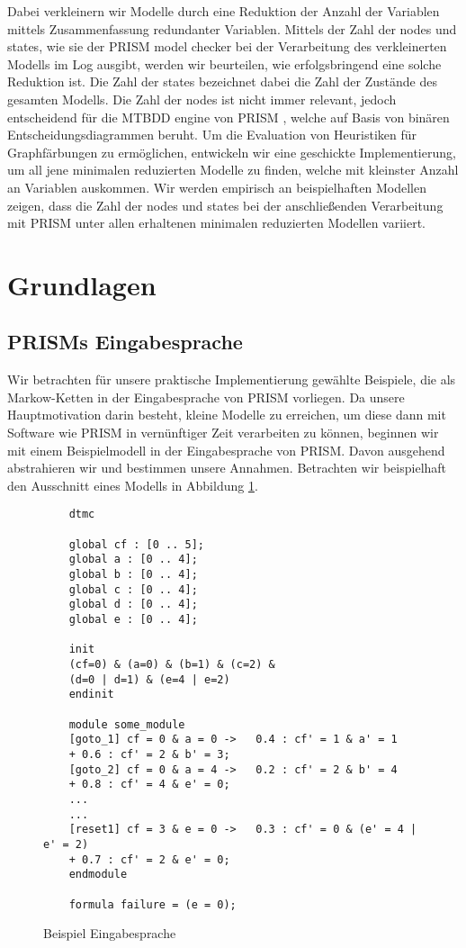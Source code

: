 \documentclass[a4paper]{article}
\newcommand{\mcpl}{Markow-Ketten}
\theoremstyle{nonumberplain}
\begin{document}
Dabei verkleinern wir Modelle durch eine Reduktion der Anzahl der Variablen mittels Zusammenfassung redundanter Variablen. Mittels der Zahl der nodes und states, wie sie der PRISM model checker bei der Verarbeitung des verkleinerten Modells im Log ausgibt, werden wir beurteilen, wie erfolgsbringend eine solche Reduktion ist. Die Zahl der states bezeichnet dabei die Zahl der Zustände des gesamten Modells. Die Zahl der nodes ist nicht immer relevant, jedoch entscheidend für die MTBDD engine von PRISM \cite{Par02}, welche auf Basis von binären Entscheidungsdiagrammen beruht.
Um die Evaluation von Heuristiken für Graphfärbungen zu ermöglichen, entwickeln wir eine geschickte Implementierung, um all jene minimalen reduzierten Modelle zu finden, welche mit kleinster Anzahl an Variablen auskommen.
Wir werden empirisch an beispielhaften Modellen zeigen, dass die Zahl der nodes und states bei der anschließenden Verarbeitung mit PRISM unter allen erhaltenen minimalen reduzierten Modellen variiert.


\section{Grundlagen}

\subsection{PRISMs Eingabesprache}

Wir betrachten für unsere praktische Implementierung gewählte Beispiele, die als \mcpl{} in der Eingabesprache von PRISM vorliegen. Da unsere Hauptmotivation darin besteht, kleine Modelle zu erreichen, um diese dann mit Software wie PRISM in vernünftiger Zeit verarbeiten zu können, beginnen wir mit einem Beispielmodell in der Eingabesprache von PRISM. Davon ausgehend abstrahieren wir und bestimmen unsere Annahmen. Betrachten wir beispielhaft den Ausschnitt eines Modells in Abbildung \ref{bspeingspr}.

\begin{figure}
\caption{Beispiel Eingabesprache}\label{bspeingspr}
{
	\footnotesize
	\begin{lstlisting}
	dtmc
	
	global cf : [0 .. 5];
	global a : [0 .. 4];
	global b : [0 .. 4];
	global c : [0 .. 4];
	global d : [0 .. 4];
	global e : [0 .. 4];
	
	init
	(cf=0) & (a=0) & (b=1) & (c=2) &
	(d=0 | d=1) & (e=4 | e=2)
	endinit
	
	module some_module
	[goto_1] cf = 0 & a = 0 ->   0.4 : cf' = 1 & a' = 1
	+ 0.6 : cf' = 2 & b' = 3;
	[goto_2] cf = 0 & a = 4 ->   0.2 : cf' = 2 & b' = 4
	+ 0.8 : cf' = 4 & e' = 0;
	...
	...
	[reset1] cf = 3 & e = 0 ->   0.3 : cf' = 0 & (e' = 4 | e' = 2)
	+ 0.7 : cf' = 2 & e' = 0;
	endmodule
	
	formula failure = (e = 0);
	\end{lstlisting}
}
\end{figure}
\end{document}
